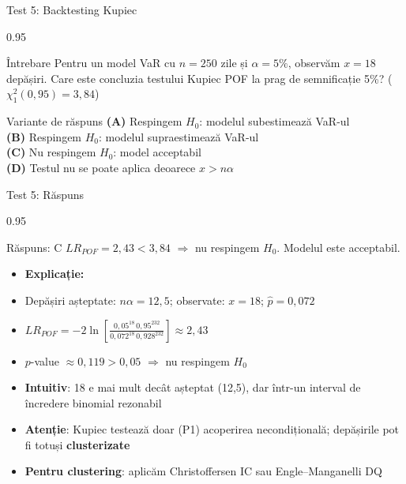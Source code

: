 \documentclass[9pt, aspectratio=169, t]{beamer}
\begin{document}
\begin{frame}[shrink=10]{Test 5: Backtesting Kupiec}
\begin{cminipage}{0.95\textwidth}
    \begin{alertblock}{Întrebare}
    Pentru un model VaR cu $n = 250$ zile și $\alpha = 5\%$, observăm $x = 18$ depășiri.
    Care este concluzia testului Kupiec POF la prag de semnificație 5\%? ($\chi^2_1(0{,}95) = 3{,}84$)
    \end{alertblock}
    \vspace{0.4cm}
    \begin{block}{Variante de răspuns}
    \textcolor{MainBlue}{\textbf{(A)}} Respingem $H_0$: modelul subestimează VaR-ul \\[3pt]
    \textcolor{MainBlue}{\textbf{(B)}} Respingem $H_0$: modelul supraestimează VaR-ul \\[3pt]
    \textcolor{MainBlue}{\textbf{(C)}} Nu respingem $H_0$: model acceptabil \\[3pt]
    \textcolor{MainBlue}{\textbf{(D)}} Testul nu se poate aplica deoarece $x > n\alpha$
    \end{block}
\end{cminipage}
\end{frame}

\begin{frame}[shrink=10]{Test 5: Răspuns}
\begin{cminipage}{0.95\textwidth}
    \begin{exampleblock}{Răspuns: C}
    $LR_{POF} = 2{,}43 < 3{,}84$ $\Rightarrow$ nu respingem $H_0$. Modelul este acceptabil.
    \end{exampleblock}
    \vspace{0.2cm}
    \begin{itemize}\setlength{\itemsep}{0pt}
        \item \textbf{Explicație:}
        \item Depășiri așteptate: $n\alpha = 12{,}5$; observate: $x = 18$; $\hat{p} = 0{,}072$
        \item $LR_{POF} = -2\ln\!\left[\frac{0{,}05^{18}\, 0{,}95^{232}}{0{,}072^{18}\, 0{,}928^{232}}\right] \approx 2{,}43$
        \item $p$-value $\approx 0{,}119 > 0{,}05$ $\Rightarrow$ nu respingem $H_0$
        \item \textbf{Intuitiv}: 18 e mai mult decât așteptat (12{,}5), dar într-un interval de încredere binomial rezonabil
        \item \textbf{Atenție}: Kupiec testează doar (P1) acoperirea necondițională; depășirile pot fi totuși \textbf{clusterizate}
        \item \textbf{Pentru clustering}: aplicăm Christoffersen IC sau Engle--Manganelli DQ
    \end{itemize}
\end{cminipage}
\end{frame}
\end{document}
